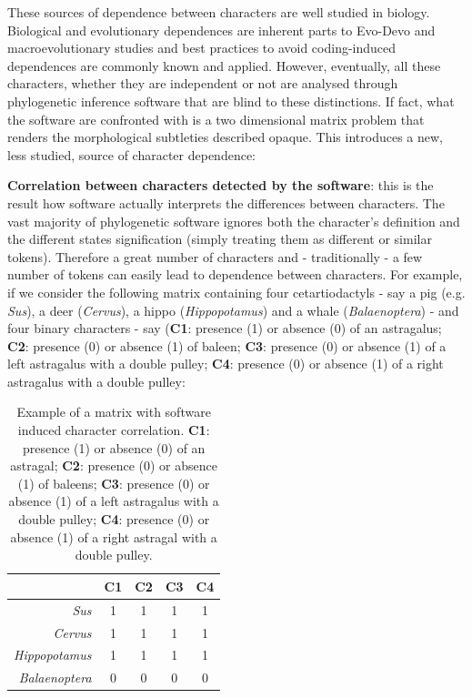 \documentclass[12pt,letterpaper]{article}
\begin{document}
These sources of dependence between characters are well studied in biology.
Biological and evolutionary dependences are inherent parts to Evo-Devo and macroevolutionary studies and best practices to avoid coding-induced dependences are commonly known and applied.
However, eventually, all these characters, whether they are independent or not are analysed through phylogenetic inference software that are blind to these distinctions.
If fact, what the software are confronted with is a two dimensional matrix problem that renders the morphological subtleties described opaque.
This introduces a new, less studied, source of character dependence:

\noindent \textbf{Correlation between characters detected by the software}: this is the result how software actually interprets the differences between characters.
The vast majority of phylogenetic software ignores both the character's definition and the different states signification (simply treating them as different or similar tokens).
Therefore a great number of characters and - traditionally - a few number of tokens can easily lead to dependence between characters.
For example, if we consider the following matrix containing four cetartiodactyls - say a pig (e.g. \textit{Sus}), a deer (\textit{Cervus}), a hippo (\textit{Hippopotamus}) and a whale (\textit{Balaenoptera}) - and four binary characters - say (\textbf{C1}: presence (1) or absence (0) of an astragalus; \textbf{C2}: presence (0) or absence (1) of baleen; \textbf{C3}: presence (0) or absence (1) of a left astragalus with a double pulley; \textbf{C4}: presence (0) or absence (1) of a right astragalus with a double pulley:

\begin{table}
\center
    \begin{tabular}{r|cccc}
            & C1 & C2 & C3 & C4\\
        \hline
        \textit{Sus} & 1 & 1 & 1 & 1\\
        \textit{Cervus} & 1 & 1 & 1 & 1\\
        \textit{Hippopotamus} & 1 & 1 & 1 & 1\\
        \textit{Balaenoptera} & 0 & 0 & 0 & 0\\
    \end{tabular}
    \caption{Example of a matrix with software induced character correlation. \textbf{C1}: presence (1) or absence (0) of an astragal; \textbf{C2}: presence (0) or absence (1) of baleens; \textbf{C3}: presence (0) or absence (1) of a left astragalus with a double pulley; \textbf{C4}: presence (0) or absence (1) of a right astragal with a double pulley.}
    \label{Tab:example_matrix}
\end{table}
\end{document}
